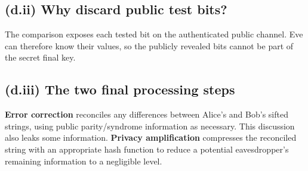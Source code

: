 \subsection*{(d.ii) Why discard public test bits?}
The comparison exposes each tested bit on the
authenticated public channel. Eve can therefore
know their values, so the publicly revealed bits
cannot be part of the secret final key.

\subsection*{(d.iii) The two final processing steps}
\textbf{Error correction} reconciles any
differences between Alice's and Bob's sifted
strings, using public parity/syndrome
information as necessary. This discussion
also leaks some information.
\textbf{Privacy amplification} compresses the
reconciled string with an appropriate hash
function to reduce a potential eavesdropper's
remaining information to a negligible level.
